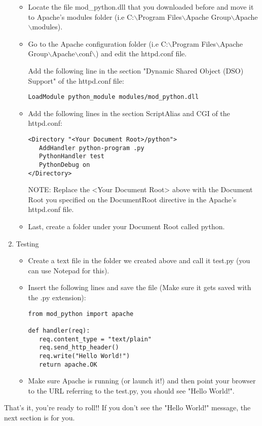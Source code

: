 \begin{enumerate}
\begin{itemize}
\item            
Locate the file mod_python.dll that you downloaded before and move it
to Apache's modules folder (i.e C:$\backslash$Program Files$\backslash$Apache
Group$\backslash$Apache$\backslash$modules).
            
\item
Go to the Apache configuration folder (i.e C:$\backslash$Program Files$\backslash$Apache Group$\backslash$Apache$\backslash$conf$\backslash$) and edit the httpd.conf file. 
            
Add the following line in the section "Dynamic Shared Object (DSO)
Support" of the httpd.conf file:

\begin{verbatim}
LoadModule python_module modules/mod_python.dll
\end{verbatim}                    

\item
Add the following lines in the section ScriptAlias and CGI of the httpd.conf: 

\begin{verbatim}                         
<Directory "<Your Document Root>/python">
   AddHandler python-program .py
   PythonHandler test
   PythonDebug on
</Directory>
\end{verbatim}                
    
                    
NOTE: Replace the <Your Document Root> above with the Document Root
you specified on the DocumentRoot directive in the Apache's httpd.conf
file.
                    
\item
Last, create a folder under your Document Root called python. 

\end{itemize}

\item
Testing

\begin{itemize}

\item            
Create a text file in the folder we created above and call it test.py
(you can use Notepad for this).
     
\item       
Insert the following lines and save the file (Make sure it gets saved
with the .py extension):

\begin{verbatim}                    
from mod_python import apache

def handler(req):
   req.content_type = "text/plain" 
   req.send_http_header()
   req.write("Hello World!")
   return apache.OK
\end{verbatim}                   

\item            
Make sure Apache is running (or launch it!) and then point your
browser to the URL referring to the test.py, you should see "Hello
World!".
     
\end{itemize}
\end{enumerate}
       
That's it, you're ready to roll!! If you don't see the "Hello World!"
message, the next section is for you.

